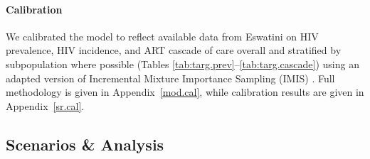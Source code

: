 \paragraph{Calibration}
We calibrated the model to reflect
available data from Eswatini on HIV prevalence, HIV incidence, and ART cascade of care
overall and stratified by subpopulation where possible
(Tables \ref{tab:targ.prev}--\ref{tab:targ.cascade})
\cite{SDHS2006,SHIMS1,SHIMS2,SHIMS3,Baral2014,EswKP2014,EswIBBS2022}
using an adapted version of Incremental Mixture Importance Sampling (IMIS) \cite{Raftery2010}.
Full methodology is given in Appendix~\ref{mod.cal},
while calibration results are given in Appendix~\ref{sr.cal}.
\subsection{Scenarios \& Analysis}\label{art.meth.obj}

